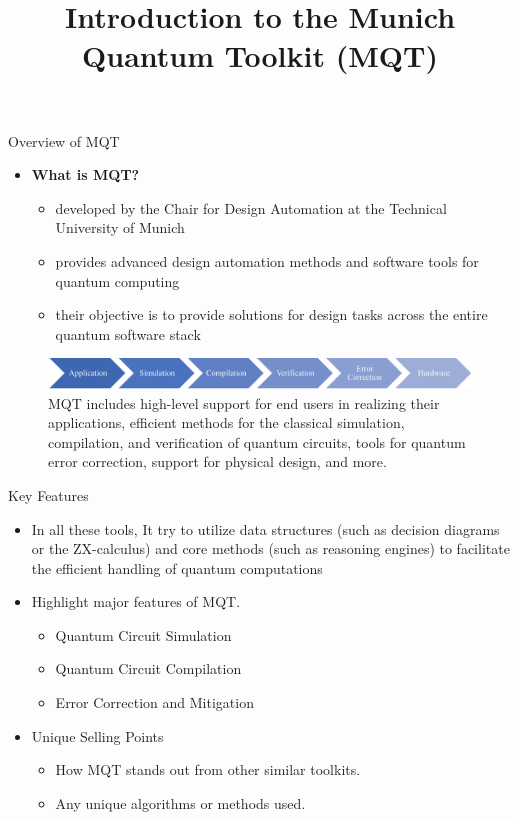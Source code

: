 \documentclass{beamer}
\title{Introduction to the Munich Quantum Toolkit (MQT)}
\begin{document}
\frame{\titlepage}

\begin{frame}{Overview of MQT}
    \begin{itemize}
        \item \textbf{What is MQT?}
        \begin{itemize}
            \item developed by the Chair for Design Automation at the Technical University of Munich
            \item provides advanced design automation methods and software tools for quantum computing
            \item their objective is to provide solutions for design tasks across the entire quantum software stack
        \end{itemize}
    \end{itemize}
    \begin{figure}
        \includegraphics[width=\textwidth]{flow}
        \caption{MQT includes high-level support for end users in realizing their applications, efficient methods for the classical simulation, compilation, and verification of quantum circuits, tools for quantum error correction, support for physical design, and more.}
    \end{figure}
\end{frame}

\begin{frame}{Key Features}
    \begin{itemize}
        \item  In all these tools, It try to utilize data structures (such as decision diagrams or the ZX-calculus) and core methods (such as reasoning engines) to
        facilitate the efficient handling of quantum computations
        \item Highlight major features of MQT.
        \begin{itemize}
            \item Quantum Circuit Simulation
            \item Quantum Circuit Compilation
            \item Error Correction and Mitigation
        \end{itemize}
        \item Unique Selling Points
        \begin{itemize}
            \item How MQT stands out from other similar toolkits.
            \item Any unique algorithms or methods used.
        \end{itemize}
    \end{itemize}
\end{frame}
\end{document}
